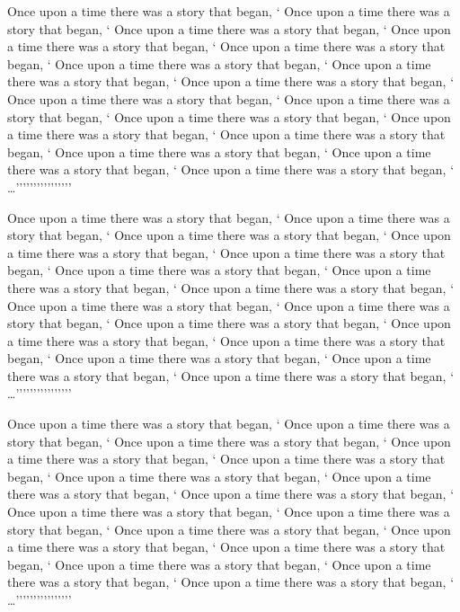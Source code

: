\documentclass[a4paper]{article}
\begin{document}
Once upon a time there was a story that began, `%
Once upon a time there was a story that began, `%
Once upon a time there was a story that began, `%
Once upon a time there was a story that began, `%
Once upon a time there was a story that began, `%
Once upon a time there was a story that began, `%
Once upon a time there was a story that began, `%
Once upon a time there was a story that began, `%
Once upon a time there was a story that began, `%
Once upon a time there was a story that began, `%
Once upon a time there was a story that began, `%
Once upon a time there was a story that began, `%
Once upon a time there was a story that began, `%
Once upon a time there was a story that began, `%
Once upon a time there was a story that began, `%
Once upon a time there was a story that began, `%
\ldots''''''''''''''''

Once upon a time there was a story that began, `%
Once upon a time there was a story that began, `%
Once upon a time there was a story that began, `%
Once upon a time there was a story that began, `%
Once upon a time there was a story that began, `%
Once upon a time there was a story that began, `%
Once upon a time there was a story that began, `%
Once upon a time there was a story that began, `%
Once upon a time there was a story that began, `%
Once upon a time there was a story that began, `%
Once upon a time there was a story that began, `%
Once upon a time there was a story that began, `%
Once upon a time there was a story that began, `%
Once upon a time there was a story that began, `%
Once upon a time there was a story that began, `%
Once upon a time there was a story that began, `%
\ldots''''''''''''''''

Once upon a time there was a story that began, `%
Once upon a time there was a story that began, `%
Once upon a time there was a story that began, `%
Once upon a time there was a story that began, `%
Once upon a time there was a story that began, `%
Once upon a time there was a story that began, `%
Once upon a time there was a story that began, `%
Once upon a time there was a story that began, `%
Once upon a time there was a story that began, `%
Once upon a time there was a story that began, `%
Once upon a time there was a story that began, `%
Once upon a time there was a story that began, `%
Once upon a time there was a story that began, `%
Once upon a time there was a story that began, `%
Once upon a time there was a story that began, `%
Once upon a time there was a story that began, `%
\ldots''''''''''''''''
\end{document}
